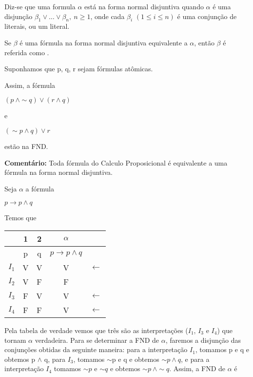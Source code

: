 \begin{defi}
    Diz-se que uma formula $\alpha$ está na forma normal disjuntiva quando $\alpha$ é uma disjunção $\beta_1 \lor \dots \lor \beta_n,\ n \geq 1$, onde cada $\beta_i$ $(1 \leq i \leq n)$ é uma conjunção de literais, ou um literal.
\end{defi}

\begin{defi}
    Se $\beta$ é uma fórmula na forma normal disjuntiva equivalente a $\alpha$, então $\beta$ é referida como .
\end{defi}

\setcounter{exemplo}{0}
\begin{exemplo}
    Suponhamos que p, q, r sejam fórmulas atômicas.

    Assim, a fórmula

    \begin{center}
        $(p\ \land \sim q) \lor (r \land q)$

        e

        $(\sim p \land q) \lor r$
    \end{center}

    estão na FND.
\end{exemplo}

\noindent \textbf{Comentário:} Toda fórmula do Calculo Proposicional é equivalente a uma fórmula na forma normal disjuntiva.

\begin{exemplo}
    Seja $\alpha$ a fórmula

    \centerline{$p \to p \land q$}
\end{exemplo}

Temos que

\begin{tabular}{c | c c c l}
    & 1 & 2 & $\alpha$ \\ \hline
    & p & q & $p \to p \land q$ & \\
    $I_1$ & V & V & V & $\longleftarrow$ \\
    $I_2$ & V & F & F & \\
    $I_3$ & F & V & V & $\longleftarrow$ \\
    $I_4$ & F & F & V & $\longleftarrow$ \\
\end{tabular}

\bigskip
Pela tabela de verdade vemos que três são as interpretações ($I_1$, $I_3$ e $I_4$) que tornam $\alpha$ verdadeira.
Para se determinar a FND de $\alpha$, faremos a disjunção das conjunções obtidas da seguinte maneira: para a interpretação $I_1$, tomamos p e q e obtemos p $\land$ q, para $I_3$, tomamos $\sim$p e q e obtemos $\sim p \land q$, e para a interpretação $I_4$ tomamos $\sim p$ e $\sim q$ e obtemos $\sim p\ \land \sim q$.
Assim, a FND de $\alpha$ é

